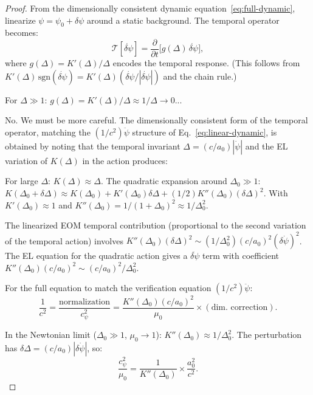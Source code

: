 \documentclass[11pt]{article}
\begin{document}
\begin{proof}
From the dimensionally consistent dynamic equation~\eqref{eq:full-dynamic},
linearize $\psi = \psi_0 + \delta\psi$ around a static background.
The temporal operator becomes:
\begin{equation}
\mathcal{T}[\dot{\delta\psi}] = \frac{\partial}{\partial t}\biggl[
  g(\Delta)\,\dot{\delta\psi}\biggr],
\end{equation}
where $g(\Delta) = K'(\Delta)/\Delta$ encodes the temporal response.
(This follows from $K'(\Delta)\,\text{sgn}(\dot{\delta\psi}) =
K'(\Delta)(\dot{\delta\psi}/|\dot{\delta\psi}|)$ and the chain rule.)

For $\Delta \gg 1$: $g(\Delta) = K'(\Delta)/\Delta \approx 1/\Delta \to 0$...

No. We must be more careful. The dimensionally consistent form of the
temporal operator, matching the $(1/c^2)\ddot\psi$ structure of
Eq.~\eqref{eq:linear-dynamic}, is obtained by noting that the
temporal invariant $\Delta = (c/a_0)|\dot\psi|$ and the EL variation
of $K(\Delta)$ in the action produces:

For large $\Delta$: $K(\Delta) \approx \Delta$. The quadratic
expansion around $\Delta_0 \gg 1$: $K(\Delta_0 + \delta\Delta) \approx
K(\Delta_0) + K'(\Delta_0)\delta\Delta + (1/2)K''(\Delta_0)(\delta\Delta)^2$.
With $K'(\Delta_0) \approx 1$ and $K''(\Delta_0) = 1/(1+\Delta_0)^2
\approx 1/\Delta_0^2$.

The linearized EOM temporal contribution (proportional to the second
variation of the temporal action) involves $K''(\Delta_0)(\delta\Delta)^2
\sim (1/\Delta_0^2)(c/a_0)^2(\delta\dot\psi)^2$. The EL equation
for the quadratic action gives a $\ddot{\delta\psi}$ term with coefficient
$K''(\Delta_0)(c/a_0)^2 \sim (c/a_0)^2/\Delta_0^2$.

For the full equation to match the verification equation $(1/c^2)\ddot\psi$:
\begin{equation}
\frac{1}{c^2} = \frac{\text{normalization}}{c_\psi^2}
= \frac{K''(\Delta_0)(c/a_0)^2}{\mu_0} \times (\text{dim.\ correction}).
\end{equation}

In the Newtonian limit ($\Delta_0 \gg 1$, $\mu_0 \to 1$):
$K''(\Delta_0) \approx 1/\Delta_0^2$. The perturbation has
$\delta\Delta = (c/a_0)|\delta\dot\psi|$, so:
\begin{equation}
\frac{c_\psi^2}{\mu_0} = \frac{1}{K''(\Delta_0)} \times \frac{a_0^2}{c^2}.
\end{equation}


\end{proof}
\end{document}
